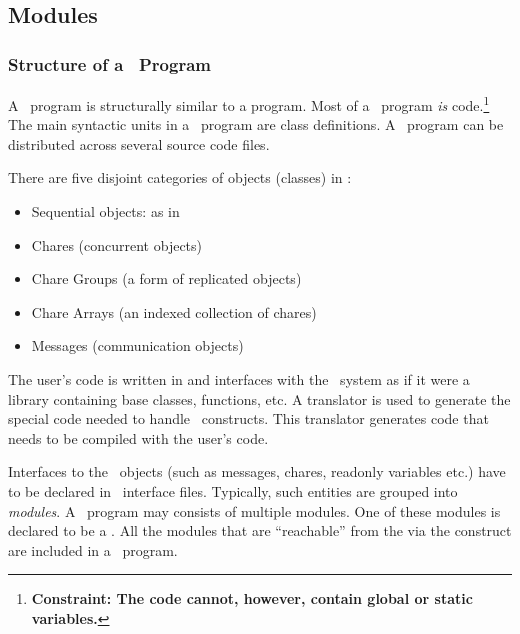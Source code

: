\subsection{Modules}

\subsubsection{Structure of a \charmpp\ Program}

A \charmpp\ program is structurally similar to a \CC{} program.  Most of a
\charmpp\ program {\em is} \CC{} code.\footnote{\bf Constraint: The \CC{} code
cannot, however, contain global or static variables.} The main syntactic units
in a \charmpp\ program are class definitions. A \charmpp\ program can be
distributed across several source code files.

There are five disjoint categories of objects (classes) in \charmpp:

\begin{itemize}
\item Sequential objects: as in \CC{}
\item Chares (concurrent objects) 
\item Chare Groups  (a form of replicated objects)
\item Chare Arrays  (an indexed collection of chares)
\item Messages (communication objects)
\end{itemize}

The user's code is written in \CC{} and interfaces with the \charmpp\ system as
if it were a library containing base classes, functions, etc.  A translator is
used to generate the special code needed to handle \charmpp\ constructs.  This
translator generates \CC{} code that needs to be compiled with the user's code.

Interfaces to the \charmpp\ objects (such as messages, chares, readonly
variables etc.)  have to be
declared in \charmpp\ interface files. Typically, such entities are grouped
 into {\em modules}. A \charmpp\ program may consists of multiple
modules.  One of these modules is declared to be a . All the
modules that are ``reachable'' from the  via the 
construct are included in a \charmpp\ program.


